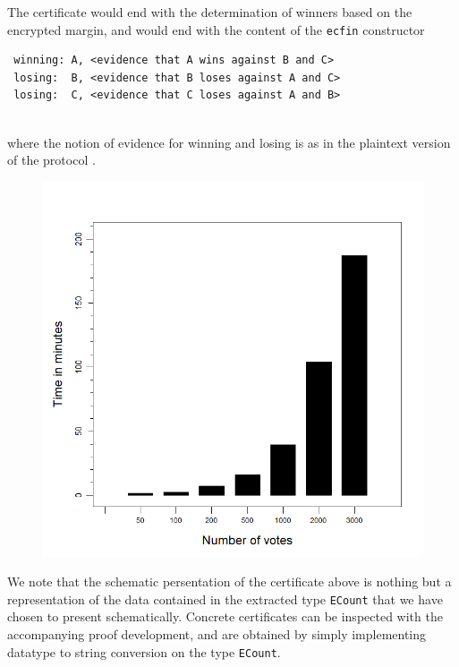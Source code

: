 \documentclass{llncs}
\begin{document}
 The certificate would end with the determination of winners based
 on the encrypted margin, and would end with the content of the
 \texttt{ecfin} constructor

 {\small\begin{verbatim}
 winning: A, <evidence that A wins against B and C>
 losing:  B, <evidence that B loses against A and C>
 losing:  C, <evidence that C loses against A and B>
 \end{verbatim}}

 \mbox{}\\[-5ex]
 where the notion of evidence for winning and losing is as in the
 plaintext version of the protocol \cite{Pattinson:2017:SVE}.

\begin{figure}
\centering
\vspace*{-1cm}
\includegraphics[scale=0.40]{PlotVer3.png}
\vspace*{-1cm}
\end{figure}
 We note that the schematic persentation of the certificate above is
 nothing but a representation of the data contained in the extracted
 type \texttt{ECount} that we have chosen to present schematically.
 Concrete certificates can be inspected with the accompanying proof
 development, and are obtained by simply implementing datatype to
 string conversion on the type \texttt{ECount}.
\end{document}
